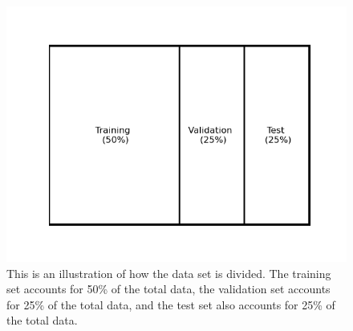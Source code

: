 \begin{figure}[h!]
	\centering
	\includegraphics[width=0.9\linewidth]{../Statistical_Sciences_template/figure/Splitting Dataset.png}
	\caption{This is an illustration of how the data set is divided. The training set accounts for 50\% of the total data, the validation set accounts for 25\% of the total data, and the test set also accounts for 25\% of the total data.}
	\label{fig:spliiting}
\end{figure}

